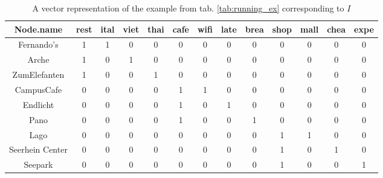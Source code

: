 \begin{table}[htp]
 \begin{adjustwidth}{-4cm}{0cm}  
     \centering
     \begin{tabular}{|c|c|c|c|c|c|c|c|c|c|c|c|c|} \hline
            Node.name & rest & ital & viet & thai & cafe & wifi & late & brea & shop & mall & chea & expe \\ \hline \hline
            Fernando's      & 1 & 1 & 0 & 0 & 0 & 0 & 0 & 0 & 0 & 0 & 0 & 0  \\  \hline
            Arche           & 1 & 0 & 1 & 0 & 0 & 0 & 0 & 0 & 0 & 0 & 0 & 0  \\  \hline
            ZumElefanten    & 1 & 0 & 0 & 1 & 0 & 0 & 0 & 0 & 0 & 0 & 0 & 0  \\ \hline
            CampusCafe      & 0 & 0 & 0 & 0 & 1 & 1 & 0 & 0 & 0 & 0 & 0 & 0 \\ \hline
            Endlicht        & 0 & 0 & 0 & 0 & 1 & 0 & 1 & 0 & 0 & 0 & 0 & 0 \\ \hline
            Pano            & 0 & 0 & 0 & 0 & 1 & 0 & 0 & 1 & 0 & 0 & 0 & 0 \\ \hline
            Lago            & 0 & 0 & 0 & 0 & 0 & 0 & 0 & 0 & 1 & 1 & 0 & 0 \\ \hline
            Seerhein Center & 0 & 0 & 0 & 0 & 0 & 0 & 0 & 0 & 1 & 0 & 1 & 0 \\ \hline
            Seepark         & 0 & 0 & 0 & 0 & 0 & 0 & 0 & 0 & 1 & 0 & 0 & 1\\ \hline
        \end{tabular}
    \caption{A vector representation of the example from tab. \ref{tab:running_ex} corresponding to $I$}
    \label{tab:vect_running_ex}
    \end{adjustwidth}
\end{table}{} \\


